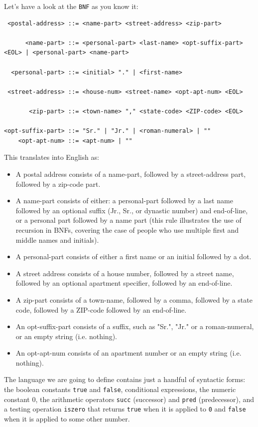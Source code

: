 \documentclass[11pt]{article}
\begin{document}
Let's have a look at the \texttt{BNF} as you know it:

\begin{verbatim}
 <postal-address> ::= <name-part> <street-address> <zip-part>

      <name-part> ::= <personal-part> <last-name> <opt-suffix-part> <EOL> | <personal-part> <name-part>

  <personal-part> ::= <initial> "." | <first-name>

 <street-address> ::= <house-num> <street-name> <opt-apt-num> <EOL>

       <zip-part> ::= <town-name> "," <state-code> <ZIP-code> <EOL>

<opt-suffix-part> ::= "Sr." | "Jr." | <roman-numeral> | ""
    <opt-apt-num> ::= <apt-num> | ""
\end{verbatim}


This translates into English as:

\begin{itemize}
\item A postal address consists of a name-part, followed by a street-address part,
followed by a zip-code part.
\item A name-part consists of either: a personal-part followed by a last name
followed by an optional suffix (Jr., Sr., or dynastic number) and end-of-line,
or a personal part followed by a name part (this rule illustrates the use of
recursion in BNFs, covering the case of people who use multiple first and
middle names and initials).
\item A personal-part consists of either a first name or an initial followed by a
dot.
\item A street address consists of a house number, followed by a street name,
followed by an optional apartment specifier, followed by an end-of-line.
\item A zip-part consists of a town-name, followed by a comma, followed by a state
code, followed by a ZIP-code followed by an end-of-line.
\item An opt-suffix-part consists of a suffix, such as "Sr.", "Jr." or a
roman-numeral, or an empty string (i.e. nothing).
\item An opt-apt-num consists of an apartment number or an empty string (i.e.
nothing).
\end{itemize}


The language we are going to define contains just a handful of syntactic forms:
the boolean constants \texttt{true} and \texttt{false}, conditional expressions, the numeric
constant 0, the arithmetic operators \texttt{succ} (successor) and \texttt{pred} (predecessor),
and a testing operation \texttt{iszero} that returns \texttt{true} when it is applied to \texttt{0} and
\texttt{false} when it is applied to some other number.
\end{document}
